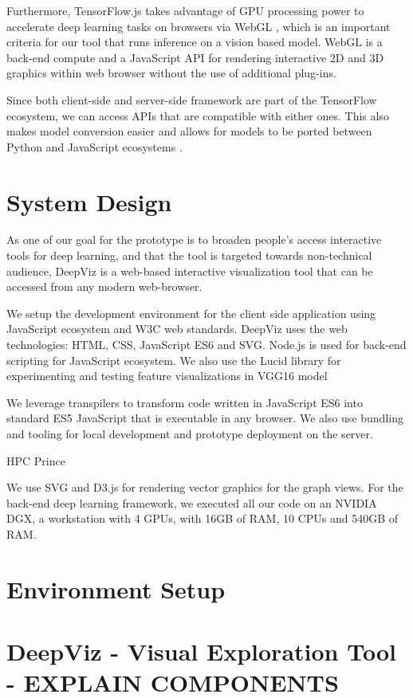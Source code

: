 Furthermore, TensorFlow.js takes advantage of GPU processing power to accelerate deep learning tasks on browsers via WebGL \cite{Ma2019}, which is an important criteria for our tool that runs inference on a vision based model. WebGL is a back-end compute and a JavaScript API for rendering interactive 2D and 3D graphics within web browser without the use of additional plug-ins.

Since both client-side and server-side framework are part of the TensorFlow ecosystem, we can access APIs that are compatible with either ones. This also makes model conversion easier and allows for models to be ported between Python and JavaScript ecosystems \cite{Smilkov2019}.

\section{System Design}

As one of our goal for the prototype is to broaden people's access interactive tools for deep learning, and that the tool is targeted towards non-technical audience, DeepViz is a web-based interactive visualization tool that can be accessed from any modern web-browser. 

We setup the development environment for the client side application using JavaScript ecosystem and W3C web standards. DeepViz uses the web technologies: HTML, CSS, JavaScript ES6 and SVG. Node.js is used for back-end scripting for JavaScript ecosystem. We also use the Lucid library for experimenting and testing feature visualizations in VGG16 model

We leverage transpilers to transform code written in JavaScript ES6 into standard ES5 JavaScript that is executable in any browser. We also use bundling and tooling for local development and prototype deployment on the server.

HPC Prince

We use SVG and D3.js for rendering vector graphics for the graph views. For the back-end deep learning framework, we executed all our code on an NVIDIA DGX, a workstation with 4 GPUs, with 16GB of RAM, 10 CPUs and 540GB of RAM.

\section{Environment Setup}

\section{DeepViz - Visual Exploration Tool - EXPLAIN COMPONENTS}

